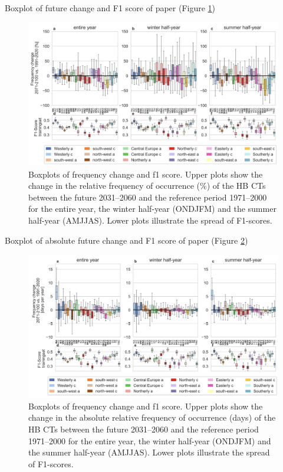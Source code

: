 \documentclass[
]{krantz}
\begin{document}
Boxplot of future change and F1 score of paper (Figure \ref{fig:boxpaper}) \citep{Mittermeier2022}

\begin{figure}

{\centering \includegraphics[width=0.7\linewidth]{work/01-weatherpattern/figures/paper/boxplot} 

}

\caption{Boxplots of frequency change and f1 score. Upper plots show the change in the relative frequency of occurrence (\%) of the HB CTs between the future 2031–2060 and the reference period 1971–2000 for the entire year, the winter half-year (ONDJFM) and the summer half-year (AMJJAS).  Lower plots illustrate the spread of F1-scores.}\label{fig:boxpaper}
\end{figure}

Boxplot of absolute future change and F1 score of paper (Figure \ref{fig:boxpaperabs}) \citep{Mittermeier2022}

\begin{figure}

{\centering \includegraphics[width=0.7\linewidth]{work/01-weatherpattern/figures/paper/boxplot_abs} 

}

\caption{Boxplots of frequency change and f1 score. Upper plots show the change in the absolute relative frequency of occurrence (days) of the HB CTs between the future 2031–2060 and the reference period 1971–2000 for the entire year, the winter half-year (ONDJFM) and the summer half-year (AMJJAS).  Lower plots illustrate the spread of F1-scores.}\label{fig:boxpaperabs}
\end{figure}
\end{document}
